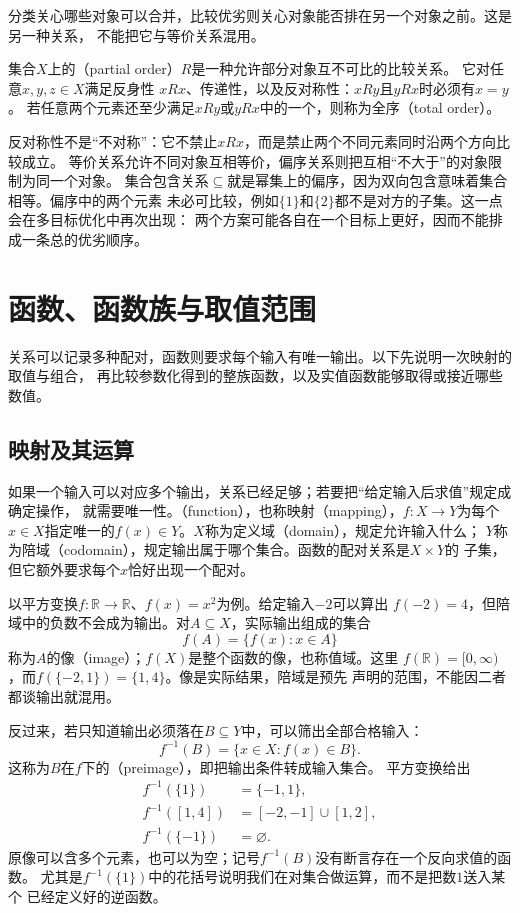 分类关心哪些对象可以合并，比较优劣则关心对象能否排在另一个对象之前。这是另一种关系，
不能把它与等价关系混用。
\begin{definition}[偏序关系]
\label{def:prelim-partial-order}
集合$X$上的（partial order）$R$是一种允许部分对象互不可比的比较关系。
它对任意$x,y,z\in X$满足反身性
$xRx$、传递性，以及反对称性：$xRy$且$yRx$时必须有$x=y$。
若任意两个元素还至少满足$xRy$或$yRx$中的一个，则称为全序（total order）。
\end{definition}
反对称性不是“不对称”：它不禁止$xRx$，而是禁止两个不同元素同时沿两个方向比较成立。
等价关系允许不同对象互相等价，偏序关系则把互相“不大于”的对象限制为同一个对象。
集合包含关系$\subseteq$就是幂集上的偏序，因为双向包含意味着集合相等。偏序中的两个元素
未必可比较，例如$\{1\}$和$\{2\}$都不是对方的子集。这一点会在多目标优化中再次出现：
两个方案可能各自在一个目标上更好，因而不能排成一条总的优劣顺序。

\section{函数、函数族与取值范围}
\label{sec:prelim-functions-value-ranges}

关系可以记录多种配对，函数则要求每个输入有唯一输出。以下先说明一次映射的取值与组合，
再比较参数化得到的整族函数，以及实值函数能够取得或接近哪些数值。

\subsection{映射及其运算}
\label{sec:prelim-map-operations}

如果一个输入可以对应多个输出，关系已经足够；若要把“给定输入后求值”规定成确定操作，
就需要唯一性。（function），也称映射（mapping），$f:X\to Y$为每个
$x\in X$指定唯一的$f(x)\in Y$。$X$称为定义域（domain），规定允许输入什么；
$Y$称为陪域（codomain），规定输出属于哪个集合。函数的配对关系是$X\times Y$的
子集，但它额外要求每个$x$恰好出现一个配对。

以平方变换$f:\mathbb{R}\to\mathbb{R}$、$f(x)=x^2$为例。给定输入$-2$可以算出
$f(-2)=4$，但陪域中的负数不会成为输出。对$A\subseteq X$，实际输出组成的集合
\[
  f(A)=\{f(x):x\in A\}
\]
称为$A$的像（image）；$f(X)$是整个函数的像，也称值域。这里
$f(\mathbb{R})=[0,\infty)$，而$f(\{-2,1\})=\{1,4\}$。像是实际结果，陪域是预先
声明的范围，不能因二者都谈输出就混用。

反过来，若只知道输出必须落在$B\subseteq Y$中，可以筛出全部合格输入：
\begin{equation}
  f^{-1}(B)=\{x\in X:f(x)\in B\}.
  \label{eq:prelim-preimage}
\end{equation}
这称为$B$在$f$下的（preimage），即把输出条件转成输入集合。
平方变换给出
\[
  \begin{aligned}
    f^{-1}(\{1\})&=\{-1,1\},\\
    f^{-1}([1,4])&=[-2,-1]\cup[1,2],\\
    f^{-1}(\{-1\})&=\varnothing.
  \end{aligned}
\]
原像可以含多个元素，也可以为空；记号$f^{-1}(B)$没有断言存在一个反向求值的函数。
尤其是$f^{-1}(\{1\})$中的花括号说明我们在对集合做运算，而不是把数$1$送入某个
已经定义好的逆函数。

